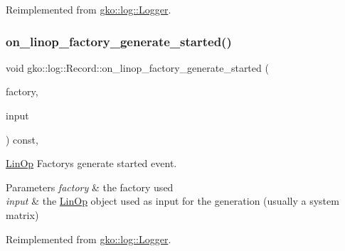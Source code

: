 Reimplemented from \hyperlink{classgko_1_1log_1_1Logger}{gko\+::log\+::\+Logger}.

\mbox{\label{classgko_1_1log_1_1Record_aed1c3d83b9749ff53546a001e3b387b0}} 
\subsubsection{\texorpdfstring{on\+\_\+linop\+\_\+factory\+\_\+generate\+\_\+started()}{on\_linop\_factory\_generate\_started()}}
{\footnotesize\ttfamily void gko\+::log\+::\+Record\+::on\+\_\+linop\+\_\+factory\+\_\+generate\+\_\+started (\begin{DoxyParamCaption}\item[{const \hyperlink{classgko_1_1LinOpFactory}{Lin\+Op\+Factory} $\ast$}]{factory,  }\item[{const \hyperlink{classgko_1_1LinOp}{Lin\+Op} $\ast$}]{input }\end{DoxyParamCaption}) const\hspace{0.3cm}{\ttfamily [override]}, {\ttfamily [virtual]}}



\hyperlink{classgko_1_1LinOp}{Lin\+Op} Factory\textquotesingle{}s generate started event. 


\begin{DoxyParams}{Parameters}
{\em factory} & the factory used \\
\hline
{\em input} & the \hyperlink{classgko_1_1LinOp}{Lin\+Op} object used as input for the generation (usually a system matrix) \\
\hline
\end{DoxyParams}


Reimplemented from \hyperlink{classgko_1_1log_1_1Logger}{gko\+::log\+::\+Logger}.

\mbox{\label{classgko_1_1log_1_1Record_af5c3f24742e70415e5af72f3f8e4e8ef}} 
